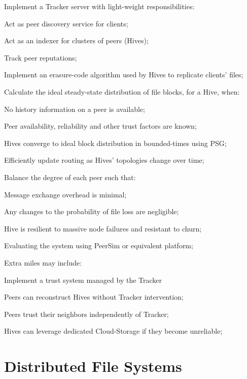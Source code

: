 \documentclass[runningheads]{llncs}
\newcommand{\SubItem}[1]{{\setlength\itemindent{15pt} \item[-] #1}}
\begin{document}
\begin{itemize}
    \item Implement a Tracker server with light-weight responsibilities:
        \SubItem{Act as peer discovery service for clients;}
        \SubItem{Act as an indexer for clusters of peers (Hives);}
        \SubItem{Track peer reputations;}
    \item Implement an erasure-code algorithm used by Hives to replicate clients' files;
    \item Calculate the ideal steady-state distribution of file blocks, for a Hive, when:
        \SubItem{No history information on a peer is available;}
        \SubItem{Peer availability, reliability and other trust factors are known;}
    \item Hives converge to ideal block distribution in bounded-times using PSG;
    \item Efficiently update routing as Hives' topologies change over time;
    \item Balance the degree of each peer such that:
        \SubItem{Message exchange overhead is minimal;}
        \SubItem{Any changes to the probability of file loss are negligible;}
        \SubItem{Hive is resilient to massive node failures and resistant to churn;}
    \item Evaluating the system using PeerSim \cite{peersim} or equivalent platform;
    \item Extra miles may include:
        \SubItem{Implement a trust system managed by the Tracker}
        \SubItem{Peers can reconstruct Hives without Tracker intervention;}
        \SubItem{Peers trust their neighbors independently of Tracker;}
        \SubItem{Hives can leverage dedicated Cloud-Storage if they become unreliable;}
\end{itemize}

\newpage\section{Distributed File Systems}\label{sec:relatedwork}
\end{document}
